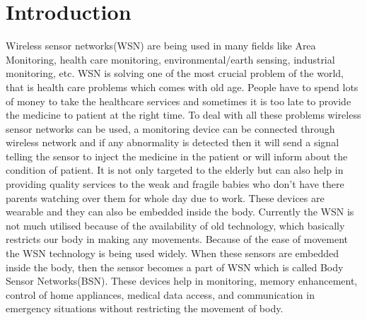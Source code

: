 \documentclass[conference]{IEEEtran}
\begin{document}
\section{Introduction}
Wireless sensor networks(WSN) are being used in many fields like Area Monitoring, health care monitoring, environmental/earth sensing, industrial monitoring, etc. WSN is solving one of the most crucial problem of the world, that is health care problems which comes with old age. People have to spend lots of money to take the healthcare services and sometimes it is too late to provide the medicine to patient at the right time. To deal with all these problems wireless sensor networks can be used, a monitoring device can be connected through wireless network and if any abnormality is detected then it will send a signal telling the sensor to inject the medicine in the patient or will inform about the condition of patient. It is not only targeted to the elderly but can also help in providing quality services to the weak and fragile babies who don't have there parents watching over them for whole day due to work. These devices are wearable and they can also be embedded inside the body.
\linebreak
\linebreak
Currently the WSN is not much utilised because of the availability of old technology, which basically restricts our body in making any movements. Because of the ease of movement the WSN technology is being used widely. When these sensors are embedded inside the body, then the sensor becomes a part of WSN which is called Body Sensor Networks(BSN). These devices help in monitoring, memory enhancement, control of home appliances, medical data access, and communication in emergency situations without restricting the movement of body.
\linebreak
\linebreak
\end{document}
